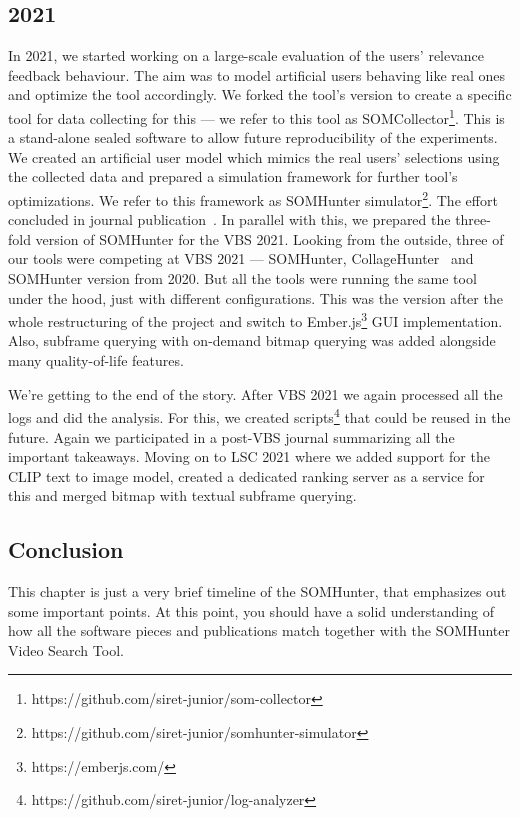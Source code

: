 \subsection{2021}
In 2021, we started working on a large-scale evaluation of the users' relevance feedback behaviour. The aim was to model artificial users behaving like real ones and optimize the tool accordingly. We forked the tool's version to create a specific tool for data collecting for this --- we refer to this tool as SOMCollector\footnote{https://github.com/siret-junior/som-collector}. This is a stand-alone sealed software to allow future reproducibility of the experiments. We created an artificial user model which mimics the real users' selections using the collected data and prepared a simulation framework for further tool's optimizations. We refer to this framework as SOMHunter simulator\footnote{https://github.com/siret-junior/somhunter-simulator}. The effort concluded in journal publication~\cite{peska2021}. In parallel with this, we prepared the three-fold version of SOMHunter for the VBS 2021. Looking from the outside, three of our tools were competing at VBS 2021 --- SOMHunter, CollageHunter~\cite{lokovc2021video} and SOMHunter version from 2020. But all the tools were running the same tool under the hood, just with different configurations. This was the version after the whole restructuring of the project and switch to Ember.js\footnote{https://emberjs.com/} GUI implementation. Also, subframe querying with on-demand bitmap querying was added alongside many quality-of-life features.

We're getting to the end of the story. After VBS 2021 we again processed all the logs and did the analysis. For this, we created scripts\footnote{https://github.com/siret-junior/log-analyzer} that could be reused in the future. Again we participated in a post-VBS journal summarizing all the important takeaways. Moving on to LSC 2021 where we added support for the CLIP text to image model, created a dedicated ranking server as a service for this and merged bitmap with textual subframe querying. 

\subsection{Conclusion}
This chapter is just a very brief timeline of the SOMHunter, that emphasizes out some important points. At this point, you should have a solid understanding of how all the software pieces and publications match together with the SOMHunter Video Search Tool.

